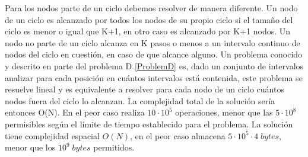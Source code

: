 \documentclass{report}
\begin{document}
Para los nodos parte de un ciclo debemos resolver de manera diferente. Un nodo de un ciclo es alcanzado por todos los nodos de su propio ciclo si el tama\~no del ciclo es menor o igual que K+1, en otro caso es alcanzado por K+1 nodos. Un nodo no parte de un ciclo alcanza en K pasos o menos a un intervalo continuo de nodos del ciclo en cuesti\'on, en caso de que alcance alguno. Un problema conocido y descrito en parte del problema D \ref{ProblemD} es, dado un conjunto de intervalos analizar para cada posici\'on en cu\'antos intervalos est\'a contenida, este problema se resuelve lineal y es equivalente a resolver para cada nodo de un ciclo cu\'antos nodos fuera del ciclo lo alcanzan. La complejidad total de la soluci\'on ser\'ia entonces O(N). En el peor caso realiza $10\cdot 10^5$ operaciones, menor que las $5 \cdot 10^8$ permisibles seg\'un el l\'imite de tiempo establecido para el problema. La soluci\'on tiene complejidad espacial $O(N)$, en el peor caso almacena $5\cdot 10^5 \cdot 4\; bytes$, menor que los $10^9 \;bytes$ permitidos. 
\end{document}
